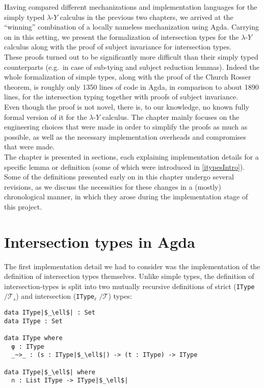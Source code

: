 \documentclass[a4paper, 12pt, twoside]{style/ociamthesis}
\theoremstyle{plain}
\theoremstyle{definition}
\theoremstyle{remark}
\newcommand{\lamy}{\lambda\text{-}Y}
\begin{document}
Having compared different mechanizations and implementation languages
for the simply typed \(\lamy\) calculus in the previous two chapters, we
arrived at the ``winning'' combination of a locally nameless
mechanization using Agda. Carrying on in this setting, we present the
formalization of intersection types for the \(\lamy\) calculus along
with the proof of subject invariance for intersection types.\\
These proofs turned out to be significantly more difficult than their
simply typed counterparts (e.g.~in case of sub-tying and subject
reduction lemmas). Indeed the whole formalization of simple types, along
with the proof of the Church Rosser theorem, is roughly only 1350 lines
of code in Agda, in comparison to about 1890 lines, for the intersection
typing together with proofs of subject invariance.\\
Even though the proof is not novel, there is, to our knowledge, no known
fully formal version of it for the \(\lamy\) calculus. The chapter
mainly focuses on the engineering choices that were made in order to
simplify the proofs as much as possible, as well as the necessary
implementation overheads and compromises that were made.\\
The chapter is presented in sections, each explaining implementation
details for a specific lemma or definition (some of which were
introduced in \cref{itypesIntro}). Some of the definitions presented
early on in this chapter undergo several revisions, as we discuss the
necessities for these changes in a (mostly) chronological manner, in
which they arose during the implementation stage of this project.

\section{Intersection types in Agda}\label{intersection-types-in-agda}

\label{itypesAgda}

The first implementation detail we had to consider was the
implementation of the definition of intersection types themselves.
Unlike simple types, the definition of intersection-types is split into
two mutually recursive definitions of strict (\texttt{IType}
\(/\mathcal{T}_s\)) and intersection (\texttt{IType}\(_\ell\)
\(/\mathcal{T}\)) types:

\begin{verbatim}
data IType|$_\ell$| : Set
data IType : Set

data IType where
  φ : IType
  _~>_ : (s : IType|$_\ell$|) -> (t : IType) -> IType

data IType|$_\ell$| where
  ∩ : List IType -> IType|$_\ell$|
\end{verbatim}
\end{document}

